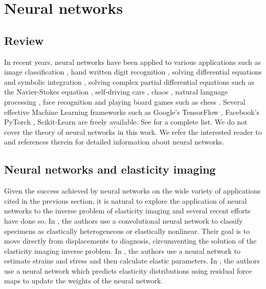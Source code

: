 \documentclass[12pt]{article}
\begin{document}
\section{Neural networks}
\subsection{Review}
In recent years, neural networks have been applied to various applications such as image classification \cite{paper:hinton2017}, hand written digit recognition \cite{paper:kulkarni2018}, solving differential equations and symbolic integration \cite{misc:lample2019}, solving complex partial differential equations such as the Navier-Stokes equation \cite{misc:anandkumar2020}, self-driving cars \cite{misc:agnihotri2019,misc:nvidiaselfdriving2016}, chaos \cite{paper:pathak2018}, natural language processing \cite{misc:googlenlp}, face recognition \cite{conf:taigman2014} and playing board games such as chess \cite{paper:alphazero}. Several effective Machine Learning frameworks such as Google's TensorFlow \cite{misc:tensorflow}, Facebook's PyTorch \cite{incollect:pytorch}, Scikit-Learn \cite{paper:scikit-learn} are freely available. See \cite{misc:compdeep} for a complete list. We do not cover the theory of neural networks in this work. We refer the interested reader to \cite{book:aggarwal,book:goodfellow,book:chollet,misc:cs231n,misc:andrewng,misc:udemy} and references therein for detailed information about neural networks.
\subsection{Neural networks and elasticity imaging}
Given the success achieved by neural networks on the wide variety of applications cited in the previous section, it is natural to explore the application of neural networks to the inverse problem of elasticity imaging and several recent efforts \cite{paper:pateloberai2019,misc:gu2020,paper:hoeriginsana2016} have done so. In \cite{paper:pateloberai2019}, the authors use a convolutional neural network to classify specimens as elastically heterogeneous or elastically nonlinear. Their goal is to move directly from displacements to diagnosis, circumventing the solution of the elasticity imaging inverse problem. In \cite{paper:hoeriginsana2016}, the authors use a neural network to estimate strains and stress and then calculate elastic parameters. In \cite{misc:gu2020}, the authors use a neural network which predicts elasticity distributions using residual force maps to update the weights of the neural network.
\end{document}

